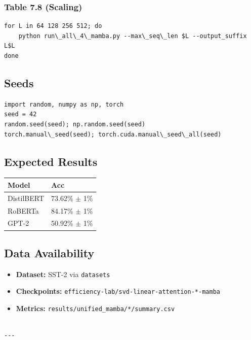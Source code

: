 \subsubsection{Table 7.8 (Scaling)}
\begin{lstlisting}
for L in 64 128 256 512; do
    python run\_all\_4\_mamba.py --max\_seq\_len $L --output_suffix L$L
done
\end{lstlisting}

\subsection{Seeds}

\begin{lstlisting}
import random, numpy as np, torch
seed = 42
random.seed(seed); np.random.seed(seed)
torch.manual\_seed(seed); torch.cuda.manual\_seed\_all(seed)
\end{lstlisting}

\subsection{Expected Results}

\begin{table}[H]
\centering
\small
\begin{tabular}{ll}
\toprule
\textbf{Model} & \textbf{Acc} \\
\midrule
DistilBERT & 73.62\% $\pm$ 1\% \\
RoBERTa & 84.17\% $\pm$ 1\% \\
GPT-2 & 50.92\% $\pm$ 1\% \\
\bottomrule
\end{tabular}
\end{table}

\subsection{Data Availability}

\begin{itemize}
\item \textbf{Dataset:} SST-2 via \texttt{datasets}
\item \textbf{Checkpoints:} \texttt{efficiency-lab/svd-linear-attention-*-mamba}
\item \textbf{Metrics:} \texttt{results/unified\_mamba/*/summary.csv}
\end{itemize}
\begin{lstlisting}

---
\end{lstlisting}